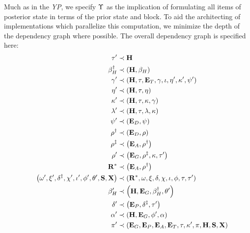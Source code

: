 Much as in the \emph{YP}, we specify $\Upsilon$ as the implication of formulating all items of posterior state in terms of the prior state and block. To aid the architecting of implementations which parallelize this computation, we minimize the depth of the dependency graph where possible. The overall dependency graph is specified here:
\begin{align}\label{eq:transitionfunctioncomposition}
  \thetime' &\prec \theheader \\
  \recenthistorypostparentstaterootupdate &\prec \tup{\theheader, \recenthistory} \label{eq:betadagger} \\
  \safrole' &\prec \tup{\theheader, \thetime, \xttickets, \safrole, \stagingset, \entropy', \activeset', \disputes'} \\
  \entropy' &\prec \tup{\theheader, \thetime, \entropy} \\
  \activeset' &\prec \tup{\theheader, \thetime, \activeset, \safrole} \\
  \previousset' &\prec \tup{\theheader, \thetime, \previousset, \activeset} \\
  \disputes' &\prec \tup{\xtdisputes, \disputes} \\
  \reportspostjudgement &\prec \tup{\xtdisputes, \reports} \label{eq:rhodagger} \\
  \reportspostguarantees &\prec \tup{\xtassurances, \reportspostjudgement} \label{eq:rhoddagger} \\
  \reports' &\prec \tup{\xtguarantees, \reportspostguarantees, \activeset, \thetime'} \label{eq:rhoprime} \\
  \justbecameavailable^* &\prec \tup{\xtassurances, \reportspostjudgement} \\
  \tup{\ready', \accumulated', \accountspostxfer, \privileges', \stagingset', \authqueue', \lastaccout', \accumulationstatistics, \deferredtransfersstatistics} &\prec \tup{\justbecameavailable^*, \ready, \accumulated, \accountspre, \privileges, \stagingset, \authqueue, \thetime, \thetime'} \label{eq:accountspostxfer} \\
  \recenthistory' &\prec \tup{\theheader, \xtguarantees, \recenthistorypostparentstaterootupdate, \lastaccout'} \label{eq:betaprime} \\
  \accountspostpreimage &\prec \tup{\xtpreimages, \accountspostxfer, \thetime'} \label{eq:accountspostpreimage} \\
  \authpool' &\prec \tup{\theheader, \xtguarantees, \authqueue', \authpool} \\
  \activity' &\prec \tup{\xtguarantees, \xtpreimages, \xtassurances, \xttickets, \thetime, \activeset', \activity, \theheader, \accumulationstatistics, \deferredtransfersstatistics}\!\!\!\!\!\!\!\!
\end{align}

